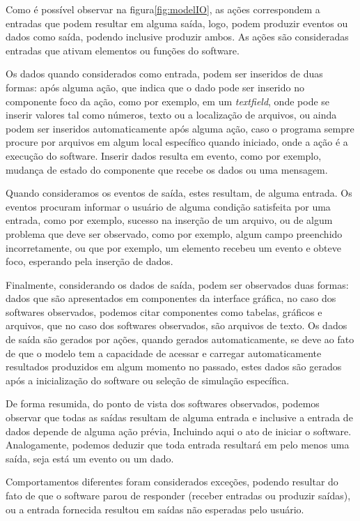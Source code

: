 \documentclass[tg]{mdtufsm}
\begin{document}
                Como é possível observar na figura\ref{fig:modelIO}, as ações correspondem a entradas que podem resultar em alguma saída, logo, podem produzir eventos ou dados como saída, podendo inclusive produzir ambos. As ações são consideradas entradas que ativam elementos ou funções do software.

                Os dados quando considerados como entrada, podem ser inseridos de duas formas: após alguma ação, que indica que o dado pode ser inserido no componente foco da ação, como por exemplo, em um \emph{textfield}, onde pode se inserir valores tal como números, texto ou a localização de arquivos, ou ainda podem ser inseridos automaticamente após alguma ação, caso o programa sempre procure por arquivos em algum local específico quando iniciado, onde a ação é a execução do software. Inserir dados resulta em  evento, como por exemplo, mudança de estado do componente que recebe os dados ou uma mensagem.

                Quando consideramos os eventos de saída, estes resultam, de alguma entrada. Os eventos procuram informar o usuário de alguma condição satisfeita por uma entrada, como por exemplo, sucesso na inserção de um arquivo, ou de algum problema que deve ser observado, como por exemplo, algum campo preenchido incorretamente, ou que por exemplo, um elemento recebeu um evento e obteve foco, esperando pela inserção de dados.

                Finalmente, considerando os dados de saída, podem ser observados duas formas: dados que são apresentados em componentes da interface gráfica, no caso dos softwares observados, podemos citar componentes como tabelas, gráficos e arquivos, que no caso dos softwares observados, são arquivos de texto. Os dados de saída são gerados por ações, quando gerados automaticamente, se deve ao fato de que o modelo tem a capacidade de acessar e carregar automaticamente resultados produzidos em algum momento no passado, estes dados são gerados após a inicialização do software ou seleção de simulação específica.

                De forma resumida, do ponto de vista dos softwares observados, podemos observar que todas as saídas resultam de alguma entrada e inclusive a entrada de dados depende de alguma ação prévia, Incluindo aqui o ato de iniciar o software. Analogamente, podemos deduzir que toda entrada resultará em pelo menos uma saída, seja está um evento ou um dado.

                Comportamentos diferentes foram considerados exceções, podendo resultar do fato de que o software parou de responder (receber entradas ou produzir saídas), ou a entrada fornecida resultou em saídas não esperadas pelo usuário.
\end{document}
